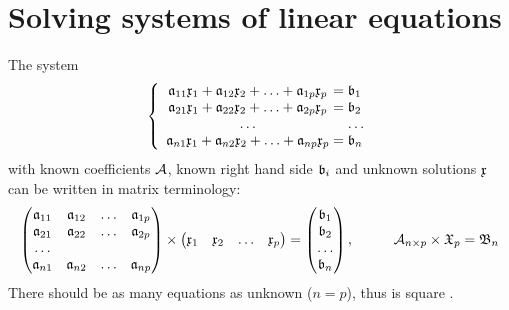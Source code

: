 \section{Solving systems of linear equations}

The system
\begin{equation}
\left\{
        \begin{array}{c@{\;}c@{\;}l}
           \AbsVec{a}_{11} \AbsVec{x}_{1} + \AbsVec{a}_{12} \AbsVec{x}_{2}  + \ldots + \AbsVec{a}_{1p} \AbsVec{x}_{p} & = & \AbsVec{b}_{1} \\
           \AbsVec{a}_{21} \AbsVec{x}_{1} + \AbsVec{a}_{22} \AbsVec{x}_{2}  + \ldots + \AbsVec{a}_{2p} \AbsVec{x}_{p} & = & \AbsVec{b}_{2} \\
           \ldots                                                                                                     &   & \ldots         \\
           \AbsVec{a}_{n1} \AbsVec{x}_{1} + \AbsVec{a}_{n2} \AbsVec{x}_{2}  + \ldots + \AbsVec{a}_{np} \AbsVec{x}_{p} & = & \AbsVec{b}_{n} \\
        \end{array}
\right.
\end{equation}
with known coefficients \(\mathcal{A} \), known right hand side \(\mathfrak{b}_{i} \) and unknown solutions \(\mathfrak{x} \) can be written in matrix terminology:
\begin{gather}
  \begin{pmatrix}
     \AbsVec{a}_{11} & \AbsVec{a}_{12} & \ldots & \AbsVec{a}_{1p} \\
     \AbsVec{a}_{21} & \AbsVec{a}_{22} & \ldots & \AbsVec{a}_{2p} \\
          \ldots     &                 &        &                 \\
     \AbsVec{a}_{n1} & \AbsVec{a}_{n2} & \ldots & \AbsVec{a}_{np}
  \end{pmatrix} \times
  \begin{pmatrix}
     \AbsVec{x}_{1}  &  \AbsVec{x}_{2} & \ldots & \AbsVec{x}_{p}
  \end{pmatrix} =
  \begin{pmatrix}
     \AbsVec{b}_{1} \\
     \AbsVec{b}_{2} \\
     \ldots         \\
     \AbsVec{b}_{n}
  \end{pmatrix}, \hspace{10mm}
  \arr{A}_{n\times p} \times \AbsVec{X}_{p} = \AbsVec{B}_{n}
\end{gather}
There should be as many equations as unknown (\( n = p \)), thus  is square \parencite{Atk-83, Bor-86, Eng-87, Pre-89, Sed-83, Ste-73, Ren-02}.

